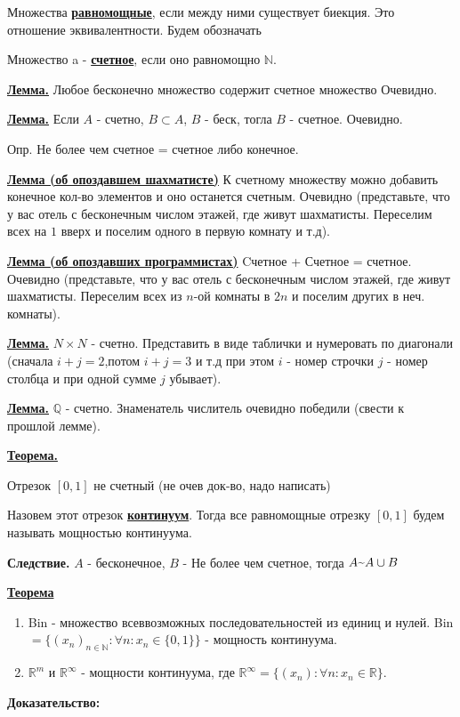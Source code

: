 \documentclass{article}
\newcommand{\deff}[1]{\underline{\textbf{#1}}}
\newcommand{\thmm}[1]{\underline{\textbf{#1}}}
\newcommand{\mytilde}{\raisebox{0.5ex}{\texttildelow}}
\begin{document}
Множества \deff{равномощные}, если между ними существует биекция. Это отношение эквивалентности. Будем обозначать \mytilde

Множество a - \deff{счетное}, если оно равномощно $\mathbb{N}$.

\thmm{Лемма.} Любое бесконечно множество содержит счетное множество Очевидно.

\thmm{Лемма.} Если $A$ - счетно, $B \subset A$, $B$ - беск, тогла $B$ - счетное. Очевидно.

Опр. Не более чем счетное = счетное либо конечное.

\thmm{Лемма (об опоздавшем шахматисте)} К счетному множеству можно добавить конечное кол-во элементов и оно останется счетным. Очевидно (представьте, что у вас отель с бесконечным числом этажей, где живут шахматисты. Переселим всех на $1$ вверх и поселим одного в первую комнату и т.д).

\thmm{Лемма (об опоздавших программистах)} Cчетное  + Счетное =  счетное. Очевидно (представьте, что у вас отель с бесконечным числом этажей, где живут шахматисты. Переселим всех из $n$-ой комнаты в $2n$ и поселим других в неч. комнаты). 

\thmm{Лемма.} $N \times N$ - счетно.  Представить в виде таблички и нумеровать по диагонали (сначала $i+j=2$,потом $i+j=3$ и т.д при этом $i$ - номер строчки $j$ - номер столбца и при одной сумме $j$ убывает). 

\thmm{Лемма.} $\mathbb{Q}$ - счетно. Знаменатель числитель очевидно победили (свести к прошлой лемме).

\thmm{Теорема.} 

Отрезок $[0,1]$ не счетный (не очев док-во, надо написать)

Назовем этот отрезок \deff{континуум}. Тогда все равномощные отрезку $[0,1]$ будем называть мощностью континуума.

\textbf{Следствие.} $A$ - бесконечное, $B$ - Не более чем счетное, тогда $A \mytilde A \cup B $

\thmm{Теорема}
\begin{enumerate}
    \item Bin - множество всеввозможных последовательностей из единиц и нулей. Bin $= \{(x_n)_{n \in \mathbb{N}}: \forall n: x_n \in \{0,1\}\} $ - мощность континуума.
    \item $\mathbb{R}^m$ и $\mathbb{R}^{\infty}$ - мощности континуума, где $\mathbb{R}^{\infty} = \{(x_n): \forall n: x_n \in \mathbb{R}\}$.
\end{enumerate}
\textbf{Доказательство:}
\end{document}

